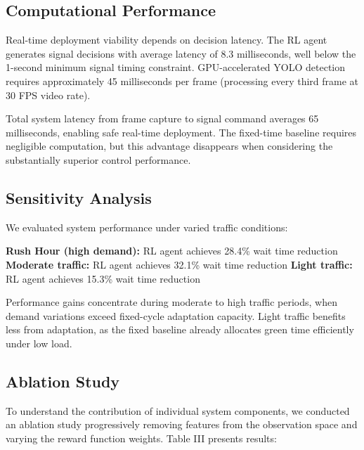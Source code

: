 \documentclass[10pt,conference]{IEEEtran}
\begin{document}
\subsection{Computational Performance}

Real-time deployment viability depends on decision latency. The RL agent generates signal decisions with average latency of 8.3 milliseconds, well below the 1-second minimum signal timing constraint. GPU-accelerated YOLO detection requires approximately 45 milliseconds per frame (processing every third frame at 30 FPS video rate).

Total system latency from frame capture to signal command averages 65 milliseconds, enabling safe real-time deployment. The fixed-time baseline requires negligible computation, but this advantage disappears when considering the substantially superior control performance.

\subsection{Sensitivity Analysis}

We evaluated system performance under varied traffic conditions:

\textbf{Rush Hour (high demand):} RL agent achieves 28.4\% wait time reduction
\textbf{Moderate traffic:} RL agent achieves 32.1\% wait time reduction  
\textbf{Light traffic:} RL agent achieves 15.3\% wait time reduction

Performance gains concentrate during moderate to high traffic periods, when demand variations exceed fixed-cycle adaptation capacity. Light traffic benefits less from adaptation, as the fixed baseline already allocates green time efficiently under low load.

\subsection{Ablation Study}

To understand the contribution of individual system components, we conducted an ablation study progressively removing features from the observation space and varying the reward function weights. Table III presents results:
\end{document}

